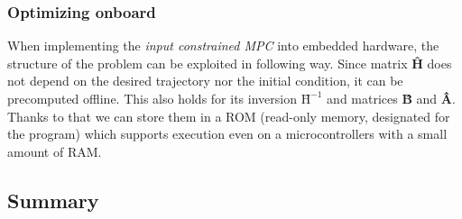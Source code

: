 \subsubsection{Optimizing onboard}

When implementing the \emph{input constrained MPC} into embedded hardware, the structure of the problem can be exploited in following way. Since matrix \textbf{\^H} does not depend on the desired trajectory nor the initial condition, it can be precomputed offline. This also holds for its inversion $\textbf{\^H}^{-1}$ and matrices \textbf{\^B} and \textbf{\^A}. Thanks to that we can store them in a ROM (read-only memory, designated for the program) which supports execution even on a microcontrollers with a small amount of RAM.

\subsection{Summary}